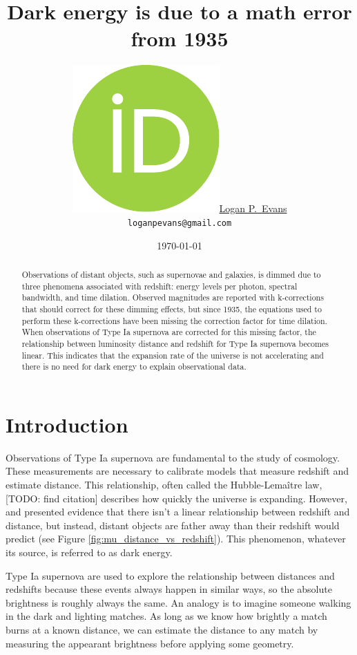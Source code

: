 \documentclass{article}
\title{Dark energy is due to a math error from 1935}
\date{\today}
\author{
  \href{https://orcid.org/0000-0001-6450-3262}{\includegraphics[scale=0.06]{orcid.pdf}\hspace{1mm}Logan P.~Evans}
  \\ \texttt{loganpevans@gmail.com}
}
\begin{document}
\maketitle

\begin{abstract}
  Observations of distant objects, such as supernovae and galaxies, is dimmed
  due to three phenomena associated with redshift: energy levels per photon,
  spectral bandwidth, and time dilation. Observed magnitudes are reported with
  k-corrections that should correct for these dimming effects, but since 1935,
  the equations used to perform these k-corrections have been missing the
  correction factor for time dilation. When observations of Type Ia supernova
  are corrected for this missing factor, the relationship between luminosity
  distance and redshift for Type Ia supernova becomes linear. This indicates
  that the expansion rate of the universe is not accelerating and there is no
  need for dark energy to explain observational data.
\end{abstract}


\section{Introduction}

Observations of Type Ia supernova are fundamental to the study of cosmology.
These measurements are necessary to calibrate models that measure redshift and
estimate distance. This relationship, often called the Hubble-Lema\^{i}tre law,
[TODO: find citation] describes how quickly the universe is expanding. However,
\citet{riess1998} and \citet{perlmutter1999} presented evidence that there
isn't a linear relationship between redshift and distance, but instead, distant
objects are father away than their redshift would predict (see Figure
\ref{fig:mu_distance_vs_redshift}). This phenomenon, whatever its source, is
referred to as dark energy.

Type Ia supernova are used to explore the relationship between distances and
redshifts because these events always happen in similar ways, so the absolute
brightness is roughly always the same. An analogy is to imagine someone walking
in the dark and lighting matches. As long as we know how brightly a match burns
at a known distance, we can estimate the distance to any match by measuring the
appearant brightness before applying some geometry.
\end{document}
